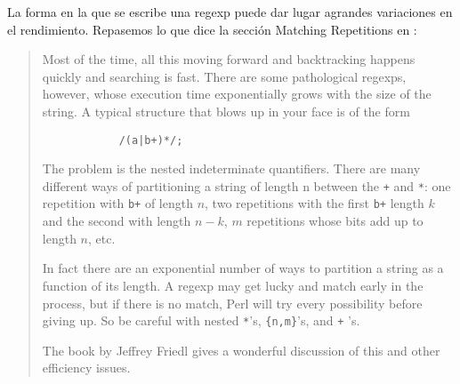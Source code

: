 
La forma en la que se escribe una regexp puede dar lugar agrandes variaciones
en el rendimiento.
Repasemos lo que dice la sección Matching Repetitions en :
\begin{it}
\begin{quotation}
Most of the time, all this moving forward and backtracking happens
quickly and searching is fast. There are some pathological regexps,
however, whose execution time exponentially grows with the size of the
string. A typical structure that blows up in your face is of the form

\begin{verbatim}
            /(a|b+)*/;
\end{verbatim}

The problem is the nested indeterminate quantifiers. 
There are many
different ways of partitioning a string of length n between the \verb|+| 
and \verb|*|: one repetition with \verb|b+| of length $n$, 
two repetitions with the first \verb|b+|
length $k$ and the second with length $n-k$, $m$ repetitions whose bits add
up to length $n$, etc. 

In fact there are an exponential number of ways
to partition a string as a function of its length. A regexp may get
lucky and match early in the process, but if there is no match, Perl
will try every possibility before giving up. So be careful with nested 
\verb|*|'s, \verb|{n,m}|'s, and \verb|+| 's. 

The book 
by Jeffrey Friedl \cite{friedl} gives a wonderful discussion of this and other efficiency issues.
\end{quotation}
\end{it}

\label{parrfo:comments}

